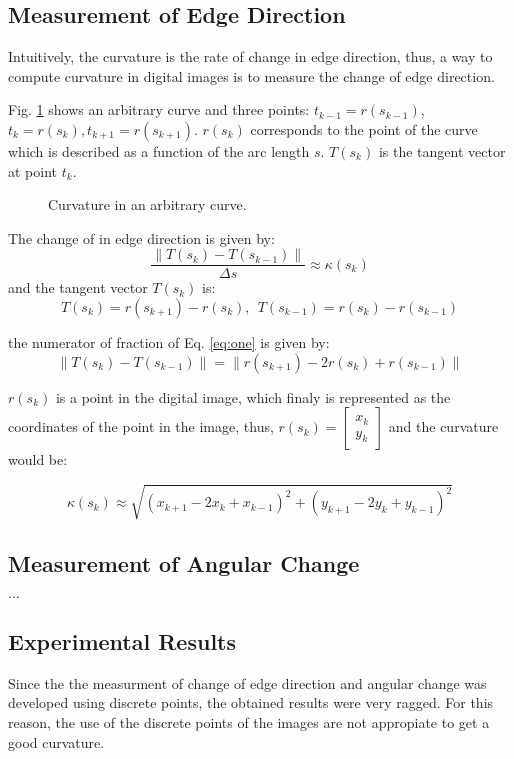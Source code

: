 \documentclass{ws-procs9x6}
\begin{document}
\subsection{Measurement of Edge Direction}
Intuitively, the curvature is the rate of change in edge direction,
thus, a way to compute curvature in digital images is to measure the
change of edge direction.



Fig. \ref{fig:curvIdea} shows an arbitrary curve and three points:
$t_{k-1}=r(s_{k-1})$, $t_{k}=r(s_{k}), t_{k+1}=r(s_{k+1})$.
$r(s_{k})$ corresponds to the point of the curve which is described as
a function of the arc length $s$. $T(s_{k})$ is the tangent vector at
point $t_{k}$.

\begin{figure}[h!tpb]
\centering
{}
\caption{Curvature in an arbitrary curve.}
\label{fig:curvIdea}
\end{figure}


The change of in edge direction is given by:
\begin{equation}
\frac{\lVert T(s_{k})-T(s_{k-1})\rVert}{\Delta s}  \approx \kappa(s_{k})
\label{eq:one}
\end{equation}
and the tangent vector $T(s_{k})$ is:
$$T(s_{k})=r(s_{k+1}) - r(s_{k}), \ \ T(s_{k-1})=r(s_{k}) - r(s_{k-1})$$

the numerator of fraction of Eq. \ref{eq:one} is given by:
$$\lVert T(s_{k}) - T(s_{k-1}) \rVert = \lVert r(s_{k+1})  - 2 r(s_{k}) + r(s_{k-1}) \rVert$$

$r(s_{k})$ is a point in the digital image, which finaly is
represented as the coordinates of the point in the image, thus,
$r(s_{k}) = \begin{bmatrix}x_{k} \\  y_{k} \end{bmatrix}$ and the curvature would be:

\begin{equation}
\kappa(s_{k}) \approx \sqrt{(x_{k+1} -2 x_{k} + x_{k-1})^{2} + (y_{k+1} -2 y_{k} + y_{k-1})^{2}}
\label{eq:two}
\end{equation}


\subsection{Measurement of Angular Change}
$\ldots$

\subsection{Experimental Results}
Since the the measurment of change of edge direction and angular
change was developed using discrete points, the obtained results were
very ragged.
For this reason, the use of the discrete points of the images are not
appropiate to get a good curvature.
\end{document}
